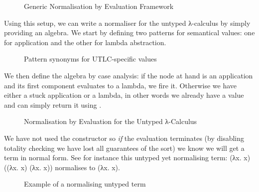 \begin{figure}[h]
\caption{Generic Normalisation by Evaluation Framework\label{defn:NbE}}
\end{figure}

Using this setup, we can write a normaliser for the untyped λ-calculus
by simply providing an algebra. We start by defining two patterns for
semantical values: one for application and the other for lambda abstraction.

\begin{figure}[h]
\caption{Pattern synonyms for UTLC-specific  values}
\end{figure}

We then define the algebra by case analysis: if the node at hand is an
application and its first component evaluates to a lambda, we fire it.
Otherwise we have either a stuck application or a lambda, in other words
we already have a value and can simply return it using .

\begin{figure}[h]
\caption{Normalisation by Evaluation for the Untyped λ-Calculus}
\end{figure}

We have not used the  constructor so \emph{if} the evaluation terminates
(by disabling totality checking we have lost all guarantees of the sort) we know
we will get a term in normal form. See for instance this untyped yet normalising
term: {(λx. x) ((λx. x) (λx. x))} normalises to {(λx. x)}.

\begin{figure}[h]
\caption{Example of a normalising untyped term}
\end{figure}
